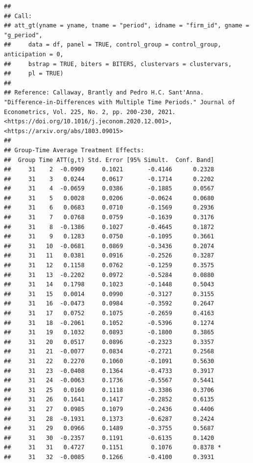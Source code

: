\documentclass[
]{article}
\begin{document}
\begin{verbatim}
## 
## Call:
## att_gt(yname = yname, tname = "period", idname = "firm_id", gname = "g_period", 
##     data = df, panel = TRUE, control_group = control_group, anticipation = 0, 
##     bstrap = TRUE, biters = BITERS, clustervars = clustervars, 
##     pl = TRUE)
## 
## Reference: Callaway, Brantly and Pedro H.C. Sant'Anna.  "Difference-in-Differences with Multiple Time Periods." Journal of Econometrics, Vol. 225, No. 2, pp. 200-230, 2021. <https://doi.org/10.1016/j.jeconom.2020.12.001>, <https://arxiv.org/abs/1803.09015> 
## 
## Group-Time Average Treatment Effects:
##  Group Time ATT(g,t) Std. Error [95% Simult.  Conf. Band]  
##     31    2  -0.0909     0.1021       -0.4146      0.2328  
##     31    3   0.0244     0.0617       -0.1714      0.2202  
##     31    4  -0.0659     0.0386       -0.1885      0.0567  
##     31    5   0.0028     0.0206       -0.0624      0.0680  
##     31    6   0.0683     0.0710       -0.1569      0.2936  
##     31    7   0.0768     0.0759       -0.1639      0.3176  
##     31    8  -0.1386     0.1027       -0.4645      0.1872  
##     31    9   0.1283     0.0750       -0.1095      0.3661  
##     31   10  -0.0681     0.0869       -0.3436      0.2074  
##     31   11   0.0381     0.0916       -0.2526      0.3287  
##     31   12   0.1158     0.0762       -0.1259      0.3575  
##     31   13  -0.2202     0.0972       -0.5284      0.0880  
##     31   14   0.1798     0.1023       -0.1448      0.5043  
##     31   15   0.0014     0.0990       -0.3127      0.3155  
##     31   16  -0.0473     0.0984       -0.3592      0.2647  
##     31   17   0.0752     0.1075       -0.2659      0.4163  
##     31   18  -0.2061     0.1052       -0.5396      0.1274  
##     31   19   0.1032     0.0893       -0.1800      0.3865  
##     31   20   0.0517     0.0896       -0.2323      0.3357  
##     31   21  -0.0077     0.0834       -0.2721      0.2568  
##     31   22   0.2270     0.1060       -0.1091      0.5630  
##     31   23  -0.0408     0.1364       -0.4733      0.3917  
##     31   24  -0.0063     0.1736       -0.5567      0.5441  
##     31   25   0.0160     0.1118       -0.3386      0.3706  
##     31   26   0.1641     0.1417       -0.2852      0.6135  
##     31   27   0.0985     0.1079       -0.2436      0.4406  
##     31   28  -0.1931     0.1373       -0.6287      0.2424  
##     31   29   0.0966     0.1489       -0.3755      0.5687  
##     31   30  -0.2357     0.1191       -0.6135      0.1420  
##     31   31   0.4727     0.1151        0.1076      0.8378 *
##     31   32  -0.0085     0.1266       -0.4100      0.3931  

\end{verbatim}
\end{document}
